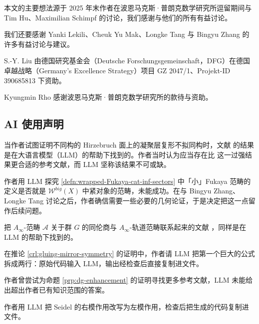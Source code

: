 本文的主要想法源于 2025 年末作者在波恩马克斯·普朗克数学研究所逗留期间与 Tim Hu、Maximilian Schimpf 的讨论，我们感谢与他们的所有有益讨论。

我们还要感谢 Yanki Lekili、Cheuk Yu Mak、Longke Tang 与 Bingyu Zhang 的许多有益讨论与建议。

S.-Y. Liu 由德国研究基金会（Deutsche Forschungsgemeinschaft，DFG）在德国卓越战略（Germany's Excellence Strategy）项目 GZ 2047/1、Projekt-ID 390685813 下资助。

Kyungmin Rho 感谢波恩马克斯·普朗克数学研究所的款待与资助。

\subsection*{AI 使用声明}

当作者试图证明不同构的 Hirzebruch 面上的凝聚层复形不拟同构时，文献 \cite{BM01} 的结果是在大语言模型（LLM）的帮助下找到的。作者当时认为应当存在比 \cite{BM01} 这一过强结果更合适的参考文献，而 LLM 坚称该结果不可或缺。

作者用 LLM 探究 \ref{defn:wrapped-Fukaya-cat-inf-sectors} 中「小」Fukaya 范畴的定义是否就是 $\mathcal{W}^{big} (X)$ 中紧对象的范畴，未能成功。在与 Bingyu Zhang、Longke Tang 讨论之后，作者确信需要一些必要的几何论证，于是决定把这一点留作后续问题。

把 $A_{\infty}$-范畴 $\mathcal{A}$ 关于群 $G$ 的同伦商与 $A_{\infty}$-轨道范畴联系起来的文献 \cite{Christ26}，同样是在 LLM 的帮助下找到的。

在推论 \ref{crl:gluing-mirror-symmetry} 的证明中，作者请 LLM 把第一个巨大的公式拆成两行：原始代码输入 LLM，输出经检查后直接复制进文件。

作者曾尝试为命题 \ref{prp:dg-enhancement} 的证明寻找更多参考文献，LLM 未能给出超出作者已有知识范围的答案。

作者用 LLM 把 Seidel \cite{Seidel08} 的右模作用改写为左模作用，检查后把生成的代码复制进文件。
